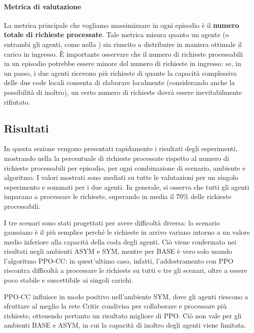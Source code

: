 \documentclass[a4paper, twocolumn]{article}
\begin{document}
\paragraph{Metrica di valutazione} La metrica principale che vogliamo massimizzare in ogni episodio è il \textbf{numero totale di richieste processate}. Tale metrica misura quanto un agente (o entrambi gli agenti, come nella ) sia riuscito a distribuire in maniera ottimale il carico in ingresso. È importante osservare che il numero di richieste processabili in un episodio potrebbe essere minore del numero di richieste in ingresso: se, in un passo, i due agenti ricevono più richieste di quante la capacità complessiva delle due code locali consenta di elaborare localmente (considerando anche la possibilità di inoltro), un certo numero di richieste dovrà essere inevitabilmente rifiutato.

\subsection{Risultati}
\label{sec:results}

In questa sezione vengono presentati rapidamente i risultati degli esperimenti, mostrando nella  la percentuale di richieste processate rispetto al numero di richieste processabili per episodio, per ogni combinazione di scenario, ambiente e algoritmo. I valori mostrati sono mediati su tutte le valutazioni per un singolo esperimento e sommati per i due agenti. In generale, si osserva che tutti gli agenti imparano a processare le richieste, superando in media il 70\% delle richieste processabili.

I tre scenari sono stati progettati per avere difficoltà diversa: lo scenario gaussiano è il più semplice perché le richieste in arrivo variano intorno a un valore medio inferiore alla capacità della coda degli agenti. Ciò viene confermato nei risultati negli ambienti ASYM e SYM, mentre per BASE è vero solo usando l'algoritmo PPO-CC: in quest'ultimo caso, infatti, l'addestramento con PPO riscontra difficoltà a processare le richieste su tutti e tre gli scenari, oltre a essere poco stabile e suscettibile ai singoli carichi.

PPO-CC influisce in modo positivo nell'ambiente SYM, dove gli agenti riescono a sfruttare al meglio la rete Critic condivisa per collaborare e processare più richieste, ottenendo pertanto un risultato migliore di PPO. Ciò non vale per gli ambienti BASE e ASYM, in cui la capacità di inoltro degli agenti viene limitata. 
\end{document}
